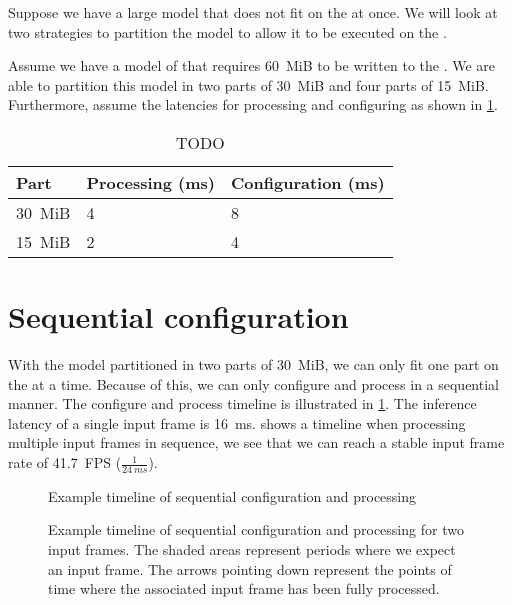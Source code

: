 Suppose we have a large model that does not fit on the \graicore{} at once.
We will look at two strategies to partition the model to allow it to be executed on the \graicore{}.

Assume we have a model of that requires \SI{60}{MiB} to be written to the \graicore{}.
We are able to partition this model in two parts of \SI{30}{MiB} and four parts of \SI{15}{MiB}.
Furthermore, assume the latencies for processing and configuring as shown in \cref{tab:partitiong_strategies_example}.

\begin{table}[hbtp]
\centering
\begin{tabular}{@{}lll@{}}
\toprule
\textbf{Part} & \textbf{Processing (ms)} & \textbf{Configuration (ms)} \\ \midrule
\SI{30}{MiB}  & 4                        & 8                           \\
\SI{15}{MiB}  & 2                        & 4                          
\end{tabular}
\caption{TODO}
\label{tab:partitiong_strategies_example}
\end{table}

\section{Sequential configuration}
With the model partitioned in two parts of \SI{30}{MiB}, we can only fit one part on the \graicore{} at a time.
Because of this, we can only configure and process in a sequential manner.
The configure and process timeline is illustrated in \cref{fig:schedule_sequential_configuration}.
The inference latency of a single input frame is \SI{16}{ms}.
 shows a timeline when processing multiple input frames in sequence, we see that we can reach a stable input frame rate of \SI{41.7}{FPS} ($\frac{1}{\SI{24}{ms}}$).

\begin{figure}[hbtp]
    \centering
    \resizebox{0.6\linewidth}{!}{
        
    }
    \caption{Example timeline of sequential configuration and processing}
    \label{fig:schedule_sequential_configuration}
\end{figure}

\begin{figure}[hbtp]
    \centering
    \resizebox{1.0\linewidth}{!}{
        
    }
    \caption{
    Example timeline of sequential configuration and processing for two input frames.
    The shaded areas represent periods where we expect an input frame.
    The arrows pointing down represent the points of time where the associated input frame has been fully processed.
    }
    \label{fig:schedule_sequential_configuration_extended}
\end{figure}

